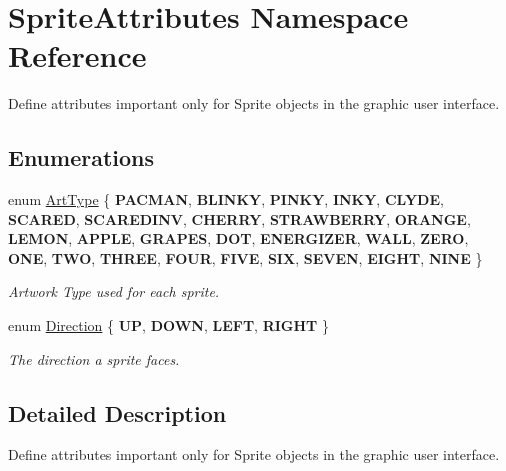 \hypertarget{namespace_sprite_attributes}{}\section{Sprite\+Attributes Namespace Reference}
\label{namespace_sprite_attributes}


Define attributes important only for Sprite objects in the graphic user interface.  


\subsection*{Enumerations}
\begin{DoxyCompactItemize}
\item 
\mbox{\label{namespace_sprite_attributes_afb5447c311bc29f0ce8ddfd025c6e998}} 
enum \mbox{\hyperlink{namespace_sprite_attributes_afb5447c311bc29f0ce8ddfd025c6e998}{Art\+Type}} \{ \newline
{\bfseries P\+A\+C\+M\+AN}, 
{\bfseries B\+L\+I\+N\+KY}, 
{\bfseries P\+I\+N\+KY}, 
{\bfseries I\+N\+KY}, 
\newline
{\bfseries C\+L\+Y\+DE}, 
{\bfseries S\+C\+A\+R\+ED}, 
{\bfseries S\+C\+A\+R\+E\+D\+I\+NV}, 
{\bfseries C\+H\+E\+R\+RY}, 
\newline
{\bfseries S\+T\+R\+A\+W\+B\+E\+R\+RY}, 
{\bfseries O\+R\+A\+N\+GE}, 
{\bfseries L\+E\+M\+ON}, 
{\bfseries A\+P\+P\+LE}, 
\newline
{\bfseries G\+R\+A\+P\+ES}, 
{\bfseries D\+OT}, 
{\bfseries E\+N\+E\+R\+G\+I\+Z\+ER}, 
{\bfseries W\+A\+LL}, 
\newline
{\bfseries Z\+E\+RO}, 
{\bfseries O\+NE}, 
{\bfseries T\+WO}, 
{\bfseries T\+H\+R\+EE}, 
\newline
{\bfseries F\+O\+UR}, 
{\bfseries F\+I\+VE}, 
{\bfseries S\+IX}, 
{\bfseries S\+E\+V\+EN}, 
\newline
{\bfseries E\+I\+G\+HT}, 
{\bfseries N\+I\+NE}
 \}
\begin{DoxyCompactList}\small\item\em Artwork Type used for each sprite. \end{DoxyCompactList}\item 
\mbox{\label{namespace_sprite_attributes_a81213e7721058c470f8001d9d7351608}} 
enum \mbox{\hyperlink{namespace_sprite_attributes_a81213e7721058c470f8001d9d7351608}{Direction}} \{ {\bfseries UP}, 
{\bfseries D\+O\+WN}, 
{\bfseries L\+E\+FT}, 
{\bfseries R\+I\+G\+HT}
 \}
\begin{DoxyCompactList}\small\item\em The direction a sprite faces. \end{DoxyCompactList}\end{DoxyCompactItemize}


\subsection{Detailed Description}
Define attributes important only for Sprite objects in the graphic user interface. 